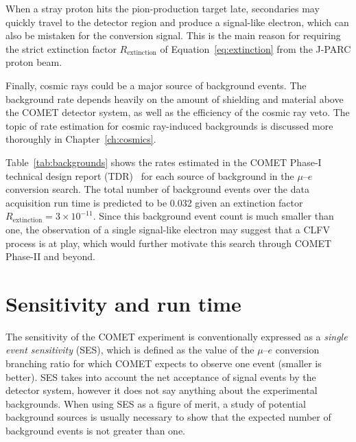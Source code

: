 When a stray proton hits the pion-production target late, secondaries may
quickly travel to the detector region and produce a signal-like electron, which
can also be mistaken for the conversion signal. This is the main reason for
requiring the strict extinction factor $R_\mathrm{extinction}$ of
Equation~\ref{eq:extinction} from the J-PARC proton beam.

Finally, cosmic rays could be a major source of background events. The
background rate depends heavily on the amount of shielding and material above
the COMET detector system, as well as the efficiency of the cosmic ray veto. The
topic of rate estimation for cosmic ray-induced backgrounds is discussed more
thoroughly in Chapter~\ref{ch:cosmics}.



Table~\ref{tab:backgrounds} shows the rates estimated in the COMET Phase-I
technical design report (TDR)~\cite[Section
10.6]{the_comet_collaboration_comet_2020} for each source of background in the
$\mu$--$e$ conversion search. The total number of background events over the
data acquisition run time is predicted to be 0.032 given an extinction factor
$R_\mathrm{extinction} = 3 \times 10^{-11}$. Since this background event count
is much smaller than one, the observation of a single signal-like electron may
suggest that a CLFV process is at play, which would further motivate this search
through COMET Phase-II and beyond.





\section{Sensitivity and run time}\label{sec:SES}

The sensitivity of the COMET experiment is conventionally expressed as a
\emph{single event sensitivity} (SES), which is defined as the value of the
$\mu$--$e$ conversion branching ratio for which COMET expects to observe one
event (smaller is better). SES takes into account the net acceptance of signal events by the
detector system, however it does not say anything about the experimental
backgrounds. When using SES as a figure of merit, a study of potential
background sources is usually necessary to show that the expected number of
background events is not greater than one. 

